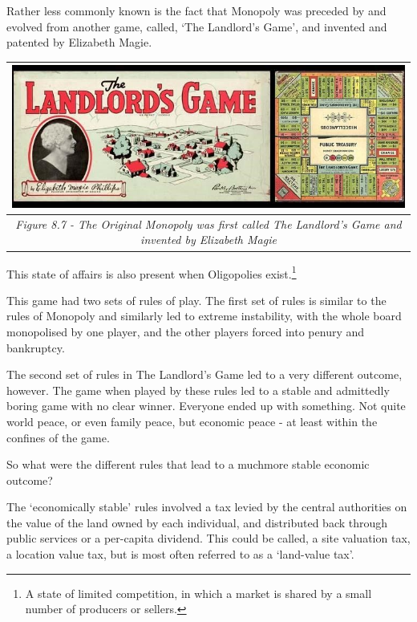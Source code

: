 \documentclass[]{tufte-handout}
\begin{document}
Rather less commonly known is the fact that Monopoly was preceded by and
evolved from another game, called, `The Landlord's Game', and invented
and patented by Elizabeth Magie.

\begin{longtable}[]{@{}c@{}}
\toprule
\begin{minipage}[b]{0.97\columnwidth}\centering
\includegraphics{ChapterPictures/8-7-Monopoly.jpg}\strut
\end{minipage}\tabularnewline
\midrule
\endhead
\begin{minipage}[t]{0.97\columnwidth}\centering
\emph{Figure 8.7 - The Original Monopoly was first called The Landlord's
Game and invented by Elizabeth Magie}\strut
\end{minipage}\tabularnewline
\bottomrule
\end{longtable}

This state of affairs is also present when Oligopolies exist.\footnote{A
  state of limited competition, in which a market is shared by a small
  number of producers or sellers.}

This game had two sets of rules of play. The first set of rules is
similar to the rules of Monopoly and similarly led to extreme
instability, with the whole board monopolised by one player, and the
other players forced into penury and bankruptcy.

The second set of rules in The Landlord's Game led to a very different
outcome, however. The game when played by these rules led to a stable
and admittedly boring game with no clear winner. Everyone ended up with
something. Not quite world peace, or even family peace, but economic
peace - at least within the confines of the game.

So what were the different rules that lead to a muchmore stable economic
outcome?

The `economically stable' rules involved a tax levied by the central
authorities on the value of the land owned by each individual, and
distributed back through public services or a per-capita dividend. This
could be called, a site valuation tax, a location value tax, but is most
often referred to as a `land-value tax'.
\end{document}
